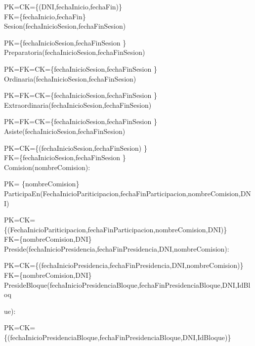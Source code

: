 PK=CK={\{(DNI,fechaInicio,fechaFin)}\}\\

FK={\{fechaInicio,fechaFin}\}\\

Sesion(fechaInicioSesion,fechaFinSesion)

PK={\{fechaInicioSesion,fechaFinSesion }\}\\

Preparatoria(fechaInicioSesion,fechaFinSesion)

PK=FK=CK={\{fechaInicioSesion,fechaFinSesion }\}\\

Ordinaria(fechaInicioSesion,fechaFinSesion)

PK=FK=CK={\{fechaInicioSesion,fechaFinSesion }\}\\

Extraordinaria(fechaInicioSesion,fechaFinSesion)

PK=FK=CK={\{fechaInicioSesion,fechaFinSesion }\}\\

Asiste(fechaInicioSesion,fechaFinSesion)

PK=CK={\{(fechaInicioSesion,fechaFinSesion) }\}\\

FK={\{fechaInicioSesion,fechaFinSesion }\}\\

Comision(nombreComision):

PK= {\{nombreComision}\}\\

ParticipaEn(FechaInicioPariticipacion,fechaFinParticipacion,nombreComision,DNI)

PK=CK={\{(FechaInicioPariticipacion,fechaFinParticipacion,nombreComision,DNI)}\}\\

FK={\{nombreComision,DNI}\}\\

Preside(fechaInicioPresidencia,fechaFinPresidencia,DNI,nombreComision):

PK=CK={\{(fechaInicioPresidencia,fechaFinPresidencia,DNI,nombreComision)}\}\\

FK={\{nombreComision,DNI}\}\\

PresideBloque(fechaInicioPresidenciaBloque,fechaFinPresidenciaBloque,DNI,IdBloq

ue):

PK=CK={\{(fechaInicioPresidenciaBloque,fechaFinPresidenciaBloque,DNI,IdBloque)}\}\\

